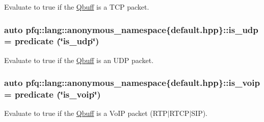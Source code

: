 Evaluate to {\ttfamily true} if the \hyperlink{structpfq_1_1lang_1_1Qbuff}{Qbuff} is a T\+CP packet. 

\subsubsection[{\texorpdfstring{is\+\_\+udp}{is_udp}}]{\setlength{\rightskip}{0pt plus 5cm}auto pfq\+::lang\+::anonymous\+\_\+namespace\{default.\+hpp\}\+::is\+\_\+udp = {\bf predicate} (\char`\"{}is\+\_\+udp\char`\"{})}\hypertarget{namespacepfq_1_1lang_1_1anonymous__namespace_02default_8hpp_03_a42701f36d9dde7f3636b90244d520a16}{}\label{namespacepfq_1_1lang_1_1anonymous__namespace_02default_8hpp_03_a42701f36d9dde7f3636b90244d520a16}


Evaluate to {\ttfamily true} if the \hyperlink{structpfq_1_1lang_1_1Qbuff}{Qbuff} is an U\+DP packet. 

\subsubsection[{\texorpdfstring{is\+\_\+voip}{is_voip}}]{\setlength{\rightskip}{0pt plus 5cm}auto pfq\+::lang\+::anonymous\+\_\+namespace\{default.\+hpp\}\+::is\+\_\+voip = {\bf predicate} (\char`\"{}is\+\_\+voip\char`\"{})}\hypertarget{namespacepfq_1_1lang_1_1anonymous__namespace_02default_8hpp_03_a79aa9beec811d735d03b40f85b4773c5}{}\label{namespacepfq_1_1lang_1_1anonymous__namespace_02default_8hpp_03_a79aa9beec811d735d03b40f85b4773c5}


Evaluate to {\ttfamily true} if the \hyperlink{structpfq_1_1lang_1_1Qbuff}{Qbuff} is a Vo\+IP packet (R\+T\+P$\vert$\+R\+T\+C\+P$\vert$\+S\+IP). 

